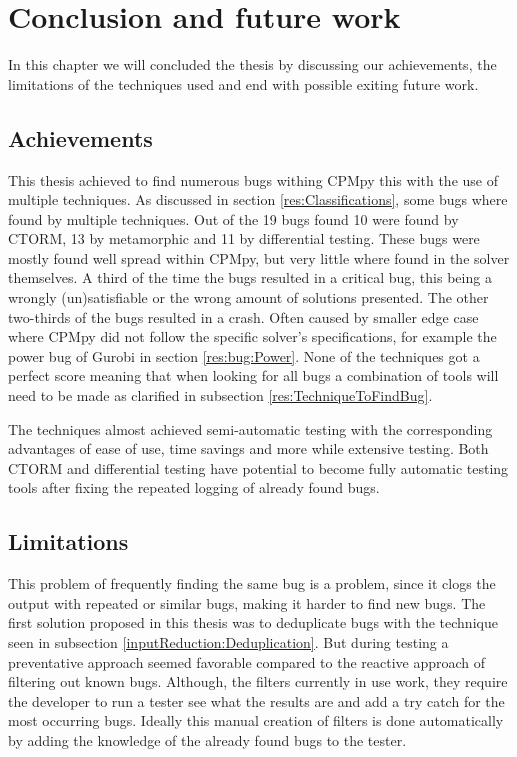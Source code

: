 \chapter{Conclusion and future work}
\label{cha:conclusion}
\label{con:intro}
In this chapter we will concluded the thesis by discussing our achievements, the limitations of the techniques used and end with possible exiting future work.


\section{Achievements}
\label{con:Achievements}
This thesis achieved to find numerous bugs withing CPMpy this with the use of multiple techniques. As discussed in section \ref{res:Classifications}, some bugs where found by multiple techniques. Out of the 19 bugs found 10 were found by CTORM, 13 by metamorphic and 11 by differential testing. These bugs were mostly found well spread within CPMpy, but very little where found in the solver themselves. A third of the time the bugs resulted in a critical bug, this being a wrongly (un)satisfiable or the wrong amount of solutions presented. The other two-thirds of the bugs resulted in a crash. Often caused by smaller edge case where CPMpy did not follow the specific solver's specifications, for example the power bug of Gurobi in section \ref{res:bug:Power}. None of the techniques got a perfect score meaning that when looking for all bugs a combination of tools will need to be made as clarified in subsection \ref{res:TechniqueToFindBug}.

The techniques almost achieved semi-automatic testing with the corresponding advantages of ease of use, time savings and more while extensive testing. Both CTORM and differential testing have potential to become fully automatic testing tools after fixing the repeated logging of already found bugs.


\section{Limitations}
\label{con:Limitations}
This problem of frequently finding the same bug is a problem, since it clogs the output with repeated or similar bugs, making it harder to find new bugs. The first solution proposed in this thesis was to deduplicate bugs with the technique seen in subsection \ref{inputReduction:Deduplication}. But during testing a preventative approach seemed  favorable compared to the reactive approach of filtering out known bugs.  Although, the filters currently in use work, they require the developer to run a tester see what the results are and add a try catch for the most occurring bugs. Ideally this manual creation of filters is done automatically by adding the knowledge of the already found bugs to the tester. 

